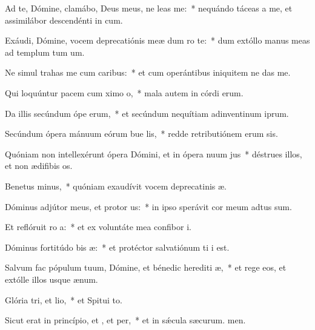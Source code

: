 \item Ad te, Dómine, clamábo, Deus meus, ne leas  me:~* nequándo táceas a me, et assimilábor descendénti in cum.
\item Exáudi, Dómine, vocem deprecatiónis meæ dum ro  te:~* dum extóllo manus meas ad templum tum um.
\item Ne simul trahas me cum caribus:~* et cum operántibus iniquitem ne das me.
\item Qui loquúntur pacem cum ximo o,~* mala autem in córdi erum.
\item Da illis secúndum ópe erum,~* et secúndum nequítiam adinventinum iprum.
\item Secúndum ópera mánuum eórum bue lis,~* redde retributiónem erum sis.
\item Quóniam non intellexérunt ópera Dómini, et in ópera nuum jus~* déstrues illos, et non ædifibis os.
\item Benetus minus,~* quóniam exaudívit vocem deprecatinis æ.
\item Dóminus adjútor meus, et protor us:~* in ipso sperávit cor meum  adtus sum.
\item Et reflóruit ro a:~* et ex voluntáte mea confibor i.
\item Dóminus fortitúdo bis æ:~* et protéctor salvatiónum ti i est.
\item Salvum fac pópulum tuum, Dómine, et bénedic herediti æ,~* et rege eos, et extólle illos usque  ænum.
\item Glória tri, et lio,~* et Spitui to.
\item Sicut erat in princípio, et , et per,~* et in sǽcula sæcurum. men.
